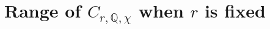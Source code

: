 \documentclass[12pt]{amsart}
\newtheorem{theorem}{Theorem}[section]
\theoremstyle{definition}
\numberwithin{equation}{section}
\newcommand{\Q}{\mathbb{Q}}
\begin{document}

\section{Range of $C_{r,\Q,\chi}$ when $r$ is fixed} \label{section-range}

\end{document}
